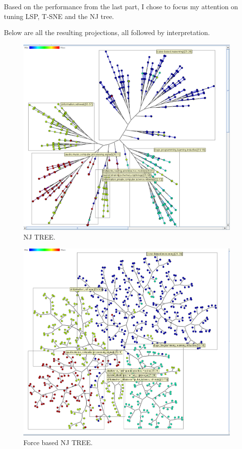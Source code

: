 \documentclass[ 10pt ]{fphw}
\begin{document}
Based on the performance from the last part, I chose to focus my attention on tuning LSP, T-SNE and the NJ tree.

Below are all the resulting projections, all followed  by interpretation.

\begin{center}
\begin{figure}[H]
    \centering
	\includegraphics[width=0.55\columnwidth]{neighbourJoiningText.png} 
	\caption{NJ TREE.}
	\label{fig:njtext}
	\end{figure}
\end{center}

\begin{center}
\begin{figure}[H]
    \centering
	\includegraphics[width=0.55\columnwidth]{forceBasedText.png} 
	\caption{Force based NJ TREE.}
	\label{fig:fbnjtext}
	\end{figure}
\end{center}
\end{document}
